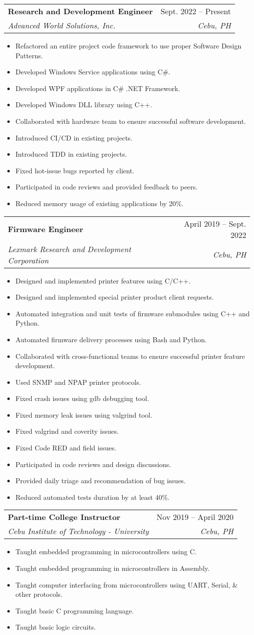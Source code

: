\documentclass[letterpaper,11pt]{article}
\makeatletter
\newcommand{\resumeItem}[1]{
  \item\small{
    {#1 \vspace{-2pt}}
  }
}
\newcommand{\resumeSubheading}[4]{
  \vspace{-2pt}\item
    \begin{tabular*}{0.97\textwidth}[t]{l@{\extracolsep{\fill}}r}
      \textbf{#1} & #2 \\
      \textit{\small#3} & \textit{\small #4} \\
    \end{tabular*}\vspace{-7pt}
}
\newcommand{\resumeItemListStart}{\begin{itemize}}
\newcommand{\resumeItemListEnd}{\end{itemize}\vspace{-5pt}}
\makeatother
\begin{document}
    \resumeSubheading
      {Research and Development Engineer}{Sept. 2022 -- Present}
      {Advanced World Solutions, Inc.}{Cebu, PH}
      \resumeItemListStart
        \resumeItem{Refactored an entire project code framework to use proper Software Design Patterns.}
        \resumeItem{Developed Windows Service applications using C\#.}
        \resumeItem{Developed WPF applications in C\# .NET Framework.}
        \resumeItem{Developed Windows DLL library using C++.}
        \resumeItem{Collaborated with hardware team to ensure successful software development.}
        \resumeItem{Introduced CI/CD in existing projects.}
        \resumeItem{Introduced TDD in existing projects.}
        \resumeItem{Fixed hot-issue bugs reported by client.}
        \resumeItem{Participated in code reviews and provided feedback to peers.}
        \resumeItem{Reduced memory usage of existing applications by 20\%.}
      \resumeItemListEnd

    \resumeSubheading
      {Firmware Engineer}{April 2019 -- Sept. 2022}
      {Lexmark Research and Development Corporation}{Cebu, PH}
      \resumeItemListStart
        \resumeItem{Designed and implemented printer features using C/C++.}
        \resumeItem{Designed and implemented special printer product client requests.}
        \resumeItem{Automated integration and unit tests of firmware submodules using C++ and Python.}
        \resumeItem{Automated firmware delivery processes using Bash and Python.}
        \resumeItem{Collaborated with cross-functional teams to ensure successful printer feature development.}
        \resumeItem{Used SNMP and NPAP printer protocols.}
        \resumeItem{Fixed crash issues using gdb debugging tool.}
        \resumeItem{Fixed memory leak issues using valgrind tool.}
        \resumeItem{Fixed valgrind and coverity issues.}
        \resumeItem{Fixed Code RED and field issues.}
        \resumeItem{Participated in code reviews and design discussions.}
        \resumeItem{Provided daily triage and recommendation of bug issues.}
        \resumeItem{Reduced automated tests duration by at least 40\%.}
    \resumeItemListEnd

    \resumeSubheading
      {Part-time College Instructor}{Nov 2019 -- April 2020}
      {Cebu Institute of Technology - University}{Cebu, PH}
      \resumeItemListStart
        \resumeItem{Taught embedded programming in microcontrollers using C.}
        \resumeItem{Taught embedded programming in microcontrollers in Assembly.}
        \resumeItem{Taught computer interfacing from microcontrollers using UART, Serial, & other protocols.}
        \resumeItem{Taught basic C programming language.}
        \resumeItem{Taught basic logic circuits.}
      \resumeItemListEnd
\end{document}
